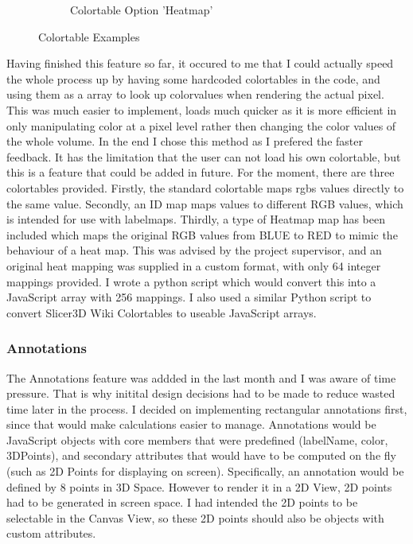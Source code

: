 \documentclass[a4paper,11pt,titlepage]{article}
\begin{document}
\begin{figure}
\begin{subfigure}{.33\textwidth}
  \caption{Colortable Option 'Heatmap'}
\end{subfigure}
\caption{Colortable Examples}

\end{figure}


Having finished this feature so far, it occured to me that I could actually speed the whole process up by having some hardcoded colortables in the code, and using them as a array to look up colorvalues when rendering the actual pixel. This was much easier to implement, loads much quicker as it is more efficient in only manipulating color at a pixel level rather then changing the color values of the whole volume. In the end I chose this method as I prefered the faster feedback. It has the limitation that the user can not load his own colortable, but this is a feature that could be added in future. For the moment, there are three colortables provided. Firstly, the standard colortable maps rgbs values directly to the same value. Secondly, an ID map maps values to different RGB values, which is intended for use with labelmaps. Thirdly, a type of Heatmap map has been included which maps the original RGB values from BLUE to RED to mimic the behaviour of a heat map. This was advised by the project supervisor, and an original heat mapping was supplied in a custom format, with only 64 integer mappings provided. I wrote a python script which would convert this into a JavaScript array with 256 mappings. I also used a similar Python script to convert Slicer3D Wiki Colortables to useable JavaScript arrays.



\subsubsection{Annotations}



The Annotations feature was addded in the last month and I was aware of time pressure. That is why initital design decisions had to be made to reduce wasted time later in the process. I decided on implementing rectangular annotations first, since that would make calculations easier to manage. Annotations would be JavaScript objects with core members that were predefined (labelName, color, 3DPoints), and secondary attributes that would have to be computed on the fly (such as 2D Points for displaying on screen). Specifically, an annotation would be defined by 8 points in 3D Space. However to render it in a 2D View, 2D points had to be generated in screen space. I had intended the 2D points to be selectable in the Canvas View, so these 2D points should also be objects with custom attributes.
\end{document}
